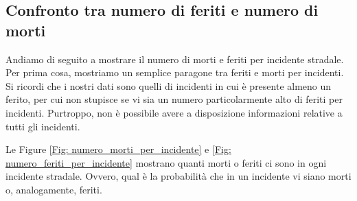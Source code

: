 \documentclass[12pt,a4paper,final,oneside]{article}			%
\begin{document}
    \subsection{Confronto tra numero di feriti e numero di morti}
    
        Andiamo di seguito a mostrare il numero di morti e feriti per incidente stradale. Per prima cosa, mostriamo un semplice paragone tra feriti e morti per incidenti.
        Si ricordi che i nostri dati sono quelli di incidenti in cui è presente almeno un ferito, per cui non stupisce se vi sia un numero particolarmente alto di feriti per incidenti. Purtroppo, non è possibile avere a disposizione informazioni relative a tutti gli incidenti.
        
        Le Figure \ref{Fig: numero_morti_per_incidente} e \ref{Fig: numero_feriti_per_incidente} mostrano quanti morti o feriti ci sono in ogni incidente stradale. Ovvero, qual è la probabilità che in un incidente vi siano morti o, analogamente, feriti.
        
\end{document}

